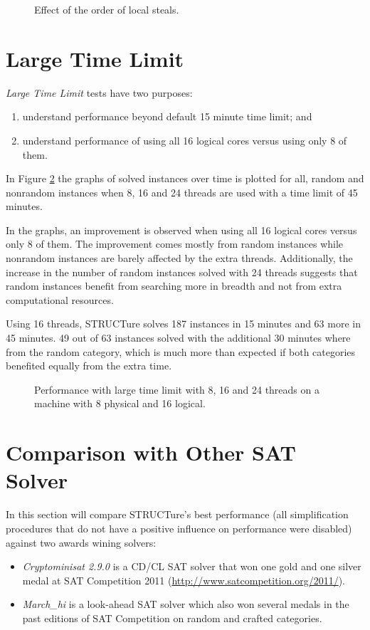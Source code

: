 \begin{figure}
  \centering
  \caption{Effect of the order of local steals.}
  \label{fig:steal-order}
\end{figure}


\section{Large Time Limit}

\emph{Large Time Limit} tests have two purposes:
\begin{enumerate}
  \item understand performance beyond default 15 minute time limit; and
  \item understand performance of using all 16 logical cores versus
  using only 8 of them.
\end{enumerate}

In Figure \ref{fig:large} the graphs of solved instances over time is
plotted for all, random and nonrandom instances when 8, 16 and 24
threads are used with a time limit of 45 minutes.

In the graphs, an improvement is observed when using all 16 logical
cores versus only 8 of them. The improvement comes mostly from
random instances while nonrandom instances are barely affected
by the extra threads.  Additionally, the increase in the number
of random instances solved with 24 threads suggests that random
instances benefit from searching more in breadth and not from extra
computational resources.

Using 16 threads, STRUCTure solves 187 instances in 15 minutes and 63
more in 45 minutes. 49 out of 63 instances solved with the additional
30 minutes where from the random category, which is much more than
expected if both categories benefited equally from the extra time.

\begin{figure}
  \centering
  \caption{Performance with large time limit with 8, 16 and 24
  threads on a machine with 8 physical and 16 logical.}
  \label{fig:large}
\end{figure}


\section{Comparison with Other SAT Solver}
\label{sec:comparison}

In this section will compare STRUCTure's best performance (all
simplification procedures that do not have a positive influence on
performance were disabled) against two awards wining solvers:
\begin{itemize}
  \item \emph{Cryptominisat 2.9.0} \cite{mine:cryptominisat} is a
  CD/CL SAT solver that won one gold and one silver medal at
  SAT Competition 2011 (\url{http://www.satcompetition.org/2011/}).

  \item \emph{March\_hi} \cite{mine:march-hi} is a look-ahead SAT
  solver which also won several medals in the past editions of SAT
  Competition on random and crafted categories.
\end{itemize}

